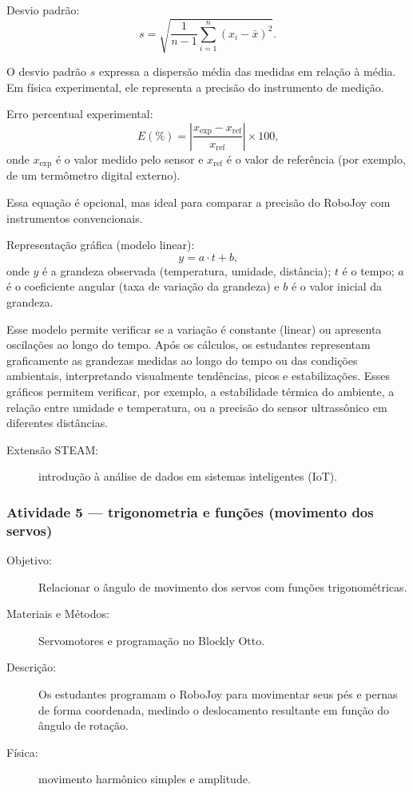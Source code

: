 \documentclass[portuguese]{textolivre}
\begin{document}
Desvio padrão:
\begin{equation}
	s = \sqrt{\frac{1}{n-1} \sum_{i=1}^{n} (x_i - \bar{x})^2} .
\end{equation}

O desvio padrão $s$ expressa a dispersão média das medidas em relação à média. Em física experimental, ele representa a precisão do instrumento de medição.

Erro percentual experimental:
\begin{equation}
	E(\%) = \left| \frac{x_{\text{exp}} - x_{\text{ref}}}{x_{\text{ref}}} \right| \times 100 \text{,}
\end{equation}
onde
$x_{\text{exp}}$ é o valor medido pelo sensor e
$x_{\text{ref}}$ é o valor de referência (por exemplo, de um termômetro digital externo). 

Essa equação é opcional, mas ideal para comparar a precisão do RoboJoy com instrumentos convencionais.

Representação gráfica (modelo linear):
\begin{equation}
	y = a \cdot t + b \text{,}
\end{equation}
onde $y$ é a grandeza observada (temperatura, umidade, distância); 
$t$ é o tempo; 
$a$ é o coeficiente angular (taxa de variação da grandeza) e 
$b$ é o valor inicial da grandeza. 

Esse modelo permite verificar se a variação é constante (linear) ou apresenta oscilações ao longo do tempo. Após os cálculos, os estudantes representam graficamente as grandezas medidas ao longo do tempo ou das condições ambientais, interpretando visualmente tendências, picos e estabilizações. Esses gráficos permitem verificar, por exemplo, a estabilidade térmica do ambiente, a relação entre umidade e temperatura, ou a precisão do sensor ultrassônico em diferentes distâncias.

\begin{description}
    \item[Extensão STEAM:] introdução à análise de dados em sistemas inteligentes (IoT).
\end{description}

\subsubsection{Atividade 5 — trigonometria e funções (movimento dos servos)}

\begin{description}
    \item[Objetivo:] Relacionar o ângulo de movimento dos servos com funções trigonométricas.
    \item[Materiais e Métodos:] Servomotores e programação no Blockly Otto.
    \item[Descrição:] Os estudantes programam o RoboJoy para movimentar seus pés e pernas de forma coordenada, medindo o deslocamento resultante em função do ângulo de rotação.
    \item[Física:] movimento harmônico simples e amplitude.
\end{description}
\end{document}

